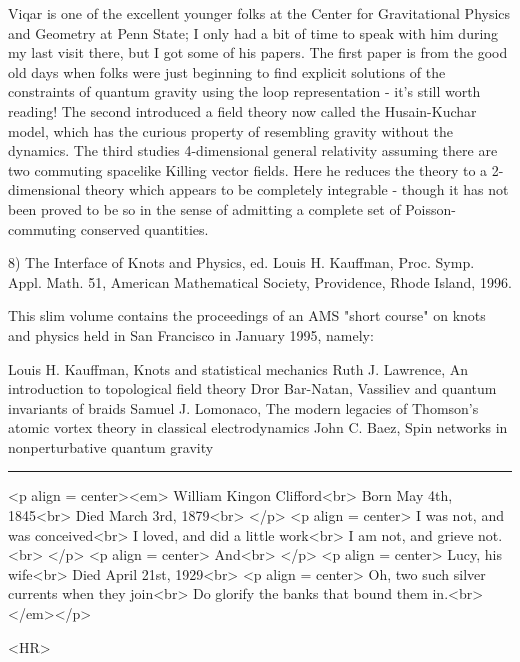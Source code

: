 Viqar is one of the excellent younger folks at the Center for
Gravitational Physics and Geometry at Penn State; I only had a bit of
time to speak with him during my last visit there, but I got some of his
papers.  The first paper is from the good old days when folks were just
beginning to find explicit solutions of the constraints of quantum
gravity using the loop representation - it's still worth reading!  The
second introduced a field theory now called the Husain-Kuchar model,
which has the curious property of resembling gravity without the
dynamics.  The third studies 4-dimensional general relativity assuming
there are two commuting spacelike Killing vector fields.  Here he
reduces the theory to a 2-dimensional theory which appears to be completely
integrable - though it has not been proved to be so in the sense of
admitting a complete set of Poisson-commuting conserved quantities.  

8) The Interface of Knots and Physics, ed. Louis H. Kauffman, Proc.
Symp. Appl. Math. 51, American Mathematical Society, Providence, Rhode
Island, 1996.  

This slim volume contains the proceedings of an AMS "short course" on
knots and physics held in San Francisco in January 1995, namely:

Louis H. Kauffman, Knots and statistical mechanics
Ruth J. Lawrence, An introduction to topological field theory
Dror Bar-Natan, Vassiliev and quantum invariants of braids
Samuel J. Lomonaco, The modern legacies of Thomson's atomic vortex
                    theory in classical electrodynamics
John C. Baez, Spin networks in nonperturbative quantum gravity

\par\noindent\rule{\textwidth}{0.4pt}
<p align = center><em>
William Kingon Clifford<br>
Born May 4th, 1845<br>
Died March 3rd, 1879<br>
</p>
<p align = center>
I was not, and was conceived<br>
I loved, and did a little work<br>
I am not, and grieve not.<br>
</p>
<p align = center>
And<br>
</p>
<p align = center>
Lucy, his wife<br>
Died April 21st, 1929<br>
<p align = center>
Oh, two such silver currents when they join<br>
Do glorify the banks that bound them in.<br>
</em></p>


<HR>



